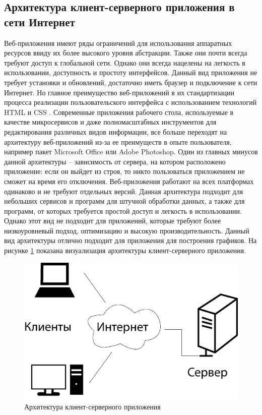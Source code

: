 \subsection{Архитектура клиент-серверного приложения в сети Интернет}
Веб-приложения имеют ряды ограничений для использования аппаратных ресурсов ввиду их более высокого уровня абстракции. Также они почти всегда требуют доступ к глобальной сети. Однако они всегда нацелены на легкость в использовании, доступность и простоту интерфейсов. Данный вид приложения не требует установки и обновлений, достаточно иметь браузер и подключение к сети Интернет. Но главное преимущество веб-приложений в их стандартизации процесса реализации пользовательского интерфейса с использованием технологий HTML и CSS \cite{27}. Современные приложения рабочего стола, используемые в качестве микросервисов и даже полномасштабных инструментов для редактирования различных видов информации, все больше переходят на архитектуру веб-приложений из-за ее преимуществ в опыте пользователя, например пакет Microsoft Office или Adobe Photoshop. Один из главных минусов данной архитектуры -- зависимость от сервера, на котором расположено приложение: если он выйдет из строя, то никто пользоваться приложением не сможет на время его отключения. Веб-приложения работают на всех платформах одинаково и не требуют отдельных версий. Данная архитектура подходит для небольших сервисов и программ для штучной обработки данных, а также для программ, от которых требуется простой доступ и легкость в использовании. Однако этот вид не подходит для приложений, которые требуют более низкоуровневый подход, оптимизацию и высокую производительность. Данный вид архитектуры отлично подходит для приложения для построения графиков. На рисунке \ref{fig:4} показана визуализация архитектуры клиент-серверного приложения.

\begin{figure}[h!]
    \center
    \includegraphics[scale=1]{fig/arc.png}
    \caption{Архитектура клиент-серверного приложения}
    \label{fig:4}
\end{figure}

